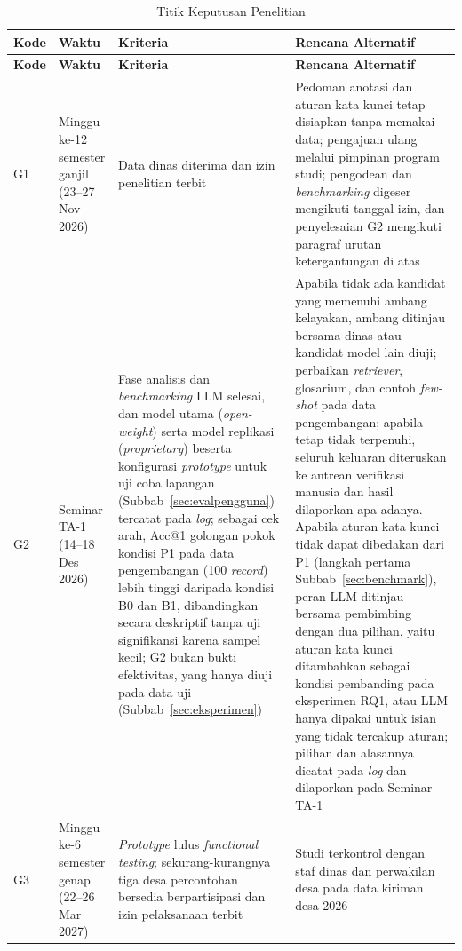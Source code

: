 {\footnotesize
\setlength{\tabcolsep}{4pt}
\renewcommand{\arraystretch}{1.15}
\begin{longtable}{|>{\centering\arraybackslash}p{}|L{0.16\textwidth}|L{0.33\textwidth}|L{0.34\textwidth}|}
\caption{Titik Keputusan Penelitian}
\label{tab:gate}\\
\hline
\textbf{Kode} & \textbf{Waktu} & \textbf{Kriteria} & \textbf{Rencana Alternatif} \\ \hline
\endfirsthead
\hline
\textbf{Kode} & \textbf{Waktu} & \textbf{Kriteria} & \textbf{Rencana Alternatif} \\ \hline
\endhead
G1 & Minggu ke-12 semester ganjil (23--27 Nov 2026) & Data dinas diterima dan izin penelitian terbit & Pedoman anotasi dan aturan kata kunci tetap disiapkan tanpa memakai data; pengajuan ulang melalui pimpinan program studi; pengodean dan \textit{benchmarking} digeser mengikuti tanggal izin, dan penyelesaian G2 mengikuti paragraf urutan ketergantungan di atas \\ \hline
G2 & Seminar TA-1 (14--18 Des 2026) & Fase analisis dan \textit{benchmarking} LLM selesai, dan model utama (\textit{open-weight}) serta model replikasi (\textit{proprietary}) beserta konfigurasi \textit{prototype} untuk uji coba lapangan (Subbab~\ref{sec:evalpengguna}) tercatat pada \textit{log}; sebagai cek arah, Acc@1 golongan pokok kondisi P1 pada data pengembangan (100 \textit{record}) lebih tinggi daripada kondisi B0 dan B1, dibandingkan secara deskriptif tanpa uji signifikansi karena sampel kecil; G2 bukan bukti efektivitas, yang hanya diuji pada data uji (Subbab~\ref{sec:eksperimen}) & Apabila tidak ada kandidat yang memenuhi ambang kelayakan, ambang ditinjau bersama dinas atau kandidat model lain diuji; perbaikan \textit{retriever}, glosarium, dan contoh \textit{few-shot} pada data pengembangan; apabila tetap tidak terpenuhi, seluruh keluaran diteruskan ke antrean verifikasi manusia dan hasil dilaporkan apa adanya. Apabila aturan kata kunci tidak dapat dibedakan dari P1 (langkah pertama Subbab~\ref{sec:benchmark}), peran LLM ditinjau bersama pembimbing dengan dua pilihan, yaitu aturan kata kunci ditambahkan sebagai kondisi pembanding pada eksperimen RQ1, atau LLM hanya dipakai untuk isian yang tidak tercakup aturan; pilihan dan alasannya dicatat pada \textit{log} dan dilaporkan pada Seminar TA-1 \\ \hline
G3 & Minggu ke-6 semester genap (22--26 Mar 2027) & \textit{Prototype} lulus \textit{functional testing}; sekurang-kurangnya tiga desa percontohan bersedia berpartisipasi dan izin pelaksanaan terbit & Studi terkontrol dengan staf dinas dan perwakilan desa pada data kiriman desa 2026 \\ \hline

\end{longtable}}
